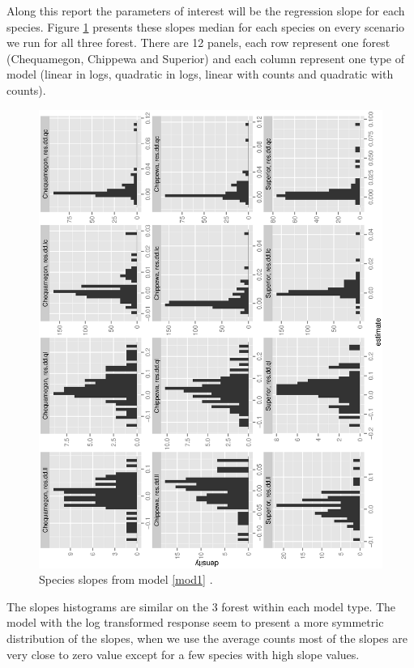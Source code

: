\documentclass{article}
\begin{document}
Along this report the parameters of interest will be the regression slope for each species.  Figure \ref{histm1} presents these slopes median for each species on every scenario we run for all three forest. There are 12 panels, each row represent one forest (Chequamegon, Chippewa and Superior) and each column represent one type of model (linear in logs, quadratic in logs, linear with counts and quadratic with counts).  
\begin{figure}[h!]
\centering
\includegraphics[scale=.5, angle=-90]{hist_m1.ps}
\caption{Species slopes from model \ref{mod1} . \label{histm1}}
\end{figure}

The slopes histograms are similar on the 3 forest within each model type. The model with the log transformed response seem to present a more symmetric distribution of the slopes, when we use the average counts most of the slopes are very close to zero value except for a few species with high slope values. 
\end{document}

